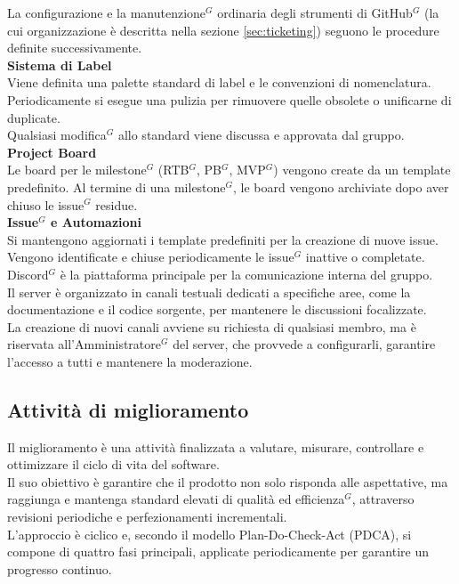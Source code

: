 La configurazione e la manutenzione$^G$ ordinaria degli strumenti di GitHub$^G$ (la cui organizzazione è descritta nella sezione \ref{sec:ticketing}) seguono le procedure definite successivamente.\\[1em]
\textbf{Sistema di Label}\\
Viene definita una palette standard di label e le convenzioni di nomenclatura. Periodicamente si esegue una pulizia per rimuovere quelle obsolete o unificarne di duplicate.\\
Qualsiasi modifica$^G$ allo standard viene discussa e approvata dal gruppo.\\[1em]
\textbf{Project Board}\\
Le board per le milestone$^G$ (RTB$^G$, PB$^G$, MVP$^G$) vengono create da un template predefinito. Al termine di una milestone$^G$, le board vengono archiviate dopo aver chiuso le issue$^G$ residue.\\[1em]
\textbf{Issue$^G$ e Automazioni}\\
Si mantengono aggiornati i template predefiniti per la creazione di nuove issue. Vengono identificate e chiuse periodicamente le issue$^G$ inattive o completate. \\

Discord$^G$ è la piattaforma principale per la comunicazione interna del gruppo.\\
Il server è organizzato in canali testuali dedicati a specifiche aree, come la documentazione e il codice sorgente, per mantenere le discussioni focalizzate.\\
La creazione di nuovi canali avviene su richiesta di qualsiasi membro, ma è riservata all'Amministratore$^G$ del server, che provvede a configurarli, garantire l'accesso a tutti e mantenere la moderazione.

\subsection{Attività di miglioramento}
Il miglioramento è una attività finalizzata a valutare, misurare, controllare e ottimizzare il ciclo di vita del software.\\
Il suo obiettivo è garantire che il prodotto non solo risponda alle aspettative, ma raggiunga e mantenga standard elevati di qualità ed efficienza$^G$, attraverso revisioni periodiche e perfezionamenti incrementali.\\
L'approccio è ciclico e, secondo il modello Plan-Do-Check-Act (PDCA), si compone di quattro fasi principali, applicate periodicamente per garantire un progresso continuo.

